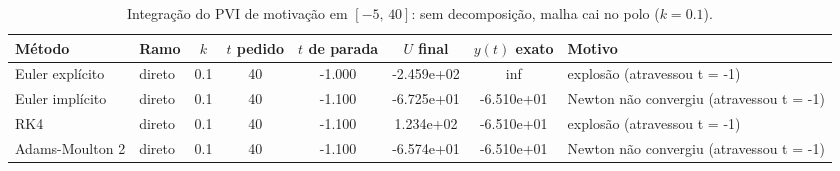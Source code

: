 \begin{table}[H]
    \centering
    \small
    \begin{tabular}{llcccccl}
        \hline
        Método & Ramo & $k$ & $t$ pedido & $t$ de parada & $U$ final & $y(t)$ exato & Motivo \\
        \hline
        Euler explícito & direto & 0.1 & 40 & -1.000 & -2.459e+02 & inf & explosão (atravessou t = -1) \\
        Euler implícito & direto & 0.1 & 40 & -1.100 & -6.725e+01 & -6.510e+01 & Newton não convergiu (atravessou t = -1) \\
        RK4 & direto & 0.1 & 40 & -1.100 & 1.234e+02 & -6.510e+01 & explosão (atravessou t = -1) \\
        Adams-Moulton 2 & direto & 0.1 & 40 & -1.100 & -6.574e+01 & -6.510e+01 & Newton não convergiu (atravessou t = -1) \\
        \hline
    \end{tabular}
    \caption{Integração do PVI de motivação em $[-5,\, 40]$: sem decomposição, malha cai no polo ($k = 0.1$).}
    \label{tab:m5_40_sem_decomp_cai_polo}
\end{table}
